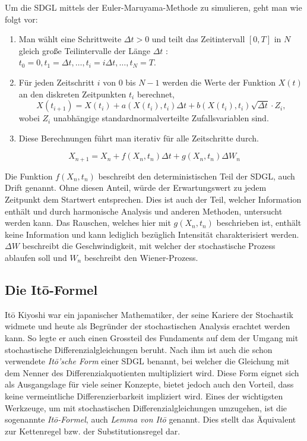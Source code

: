 Um die SDGL mittels der Euler-Maruyama-Methode zu simulieren, geht man wie folgt vor:

\begin{enumerate}
	\item Man wählt eine Schrittweite $ \Delta t > 0 $ und teilt das Zeitintervall $ [0, T] $ in $ N $ gleich große Teilintervalle der Länge $ \Delta t$ : $ t_0 = 0, t_1 = \Delta t, \dots, t_i = i\Delta t, \dots, t_N = T $.
	\item Für jeden Zeitschritt $ i $ von $ 0 $ bis $ N-1 $ werden die Werte der Funktion $ X(t) $ an den diskreten Zeitpunkten $ t_i $ berechnet,
	\begin{equation}
		X(t_{i+1}) = X(t_i) + a(X(t_i), t_i) \Delta t + b(X(t_i), t_i) \sqrt{\Delta t} \cdot Z_i,
	\end{equation}
	wobei $ Z_i $ unabhängige standardnormalverteilte Zufallsvariablen sind.
	\item Diese Berechnungen führt man iterativ für alle Zeitschritte durch.
\end{enumerate}

\begin{equation}
	X_{n+1} = X_n + f(X_n,t_n) \Delta t + g(X_n,t_n) \Delta W_n
\end{equation}

Die Funktion $ f(X_n,t_n) $ beschreibt den deterministischen Teil der SDGL, auch Drift genannt. Ohne diesen Anteil, würde der Erwartungswert zu jedem Zeitpunkt dem Startwert entsprechen. Dies ist auch der Teil, welcher Information enthält und durch harmonische Analysis und anderen Methoden, untersucht werden kann. Das Rauschen, welches hier mit $ g(X_n,t_n) $ beschrieben ist, enthält keine Information und kann lediglich bezüglich Intensität charakterisiert werden. $ \Delta W $ beschreibt die Geschwindigkeit, mit welcher der stochastische Prozess ablaufen soll und $ W_n $  beschreibt den Wiener-Prozess.



\subsection{Die Itō-Formel\label{brown:ito}}

Itō Kiyoshi war ein japanischer Mathematiker, der seine Kariere der Stochastik widmete und heute als Begründer der stochastischen Analysis erachtet werden kann. So legte er auch einen Grossteil des Fundaments auf dem der Umgang mit stochastische Differenzialgleichungen beruht. 
Nach ihm ist auch die schon verwendete \textit{Itō'sche Form} einer SDGL benannt, bei welcher die Gleichung mit dem Nenner des Differenzialquotienten multipliziert wird. Diese Form eignet sich als Ausgangslage für viele seiner Konzepte, bietet jedoch auch den Vorteil, dass keine vermeintliche Differenzierbarkeit impliziert wird.
Eines der wichtigsten Werkzeuge, um mit stochastischen Differenzialgleichungen umzugehen, ist die sogenannte \textit{Itō-Formel}, auch \textit{Lemma von Itō} genannt. Dies stellt das Äquivalent zur Kettenregel bzw. der Substitutionsregel dar. %


